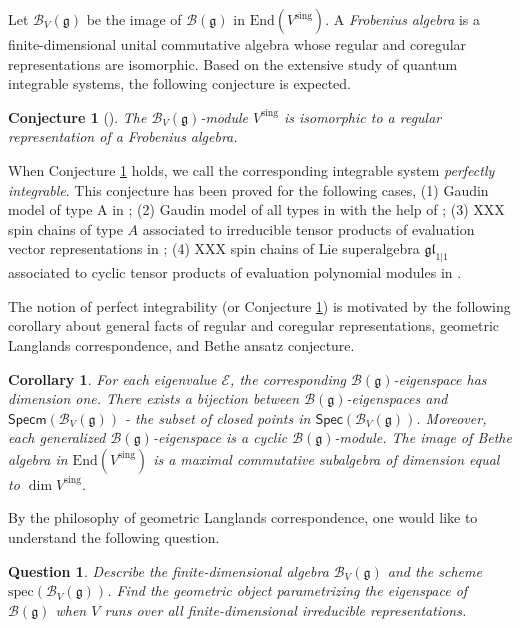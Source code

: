 \documentclass[11pt,reqno]{amsart}
\numberwithin{equation}{section}
\newtheorem{cor}[thm]{Corollary}
\newtheorem{conj}[thm]{Conjecture}
\newtheorem{open}[thm]{Question}
\theoremstyle{definition}
\theoremstyle{remark}
\newcommand{\mc}{\mathcal}
\newcommand{\gl}{\mathfrak{gl}}
\newcommand{\g}{\mathfrak{g}}
\newcommand{\End}{\mathrm{End}}
\newcommand{\sing}{{\mathrm{sing}}}
\begin{document}
Let $\mc B_V(\g)$ be the image of $\mc B(\g)$ in $\End(V^\sing)$. A \textit{Frobenius algebra} is a finite-dimensional unital commutative algebra whose regular and coregular representations are isomorphic. Based on the extensive study of quantum integrable systems, the following conjecture is expected.

\begin{conj}[\cite{Lu:2019}]\label{conj frob-int}
The $\mc B_V(\g)$-module $V^\sing$ is isomorphic to a regular representation of a Frobenius algebra.
\end{conj}

When Conjecture \ref{conj frob-int} holds, we call the corresponding integrable system \emph{perfectly integrable}. This conjecture has been proved for the following cases, (1) Gaudin model of type A in \cite{MTV:2008a,MTV:2009b}; (2) Gaudin model of all types in \cite{Lu:2019} with the help of \cite{FF:1992,FFRy:2010,Ryb:2018}; (3) XXX spin chains of type $A$ associated to irreducible tensor products of evaluation vector representations in \cite{MTV:2014}; (4) XXX spin chains of Lie superalgebra $\gl_{1|1}$ associated to cyclic tensor products of evaluation polynomial modules in \cite{LM:2019}.

The notion of perfect integrability (or Conjecture \ref{conj frob-int}) is motivated by the following corollary about general facts of regular and coregular representations, geometric Langlands correspondence, and Bethe ansatz conjecture.

\begin{cor}
For each eigenvalue $\mathcal E$, the corresponding $\mc B(\g)$-eigenspace has dimension one. There exists a bijection between $\mc B(\g)$-eigenspaces and $\mathsf{Specm}(\mc B_V(\g))$ - the subset of closed points in $\mathsf{Spec}(\mc B_V(\g))$. Moreover, each generalized $\mc B(\g)$-eigenspace is a cyclic $\mc B(\g)$-module. The image of Bethe algebra in $\End(V^\sing)$ is a maximal commutative subalgebra of dimension equal to $\dim V^\sing$.
\end{cor}

By the philosophy of geometric Langlands correspondence, one would like to understand the following question.
\begin{open}\label{que langlands}
Describe the finite-dimensional algebra $\mc B_V(\g)$ and the scheme $\mathrm{spec}(\mc B_V(\g))$. Find the geometric object parametrizing the eigenspace of $\mc B(\g)$ when $V$ runs over all finite-dimensional irreducible representations.
\end{open}
\end{document}
